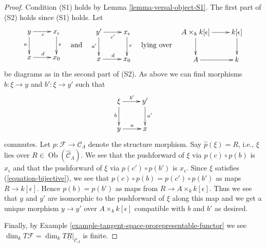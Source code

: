 \documentclass[10pt,a4paper]{amsart}
\theoremstyle{plain}
\theoremstyle{definition}
\theoremstyle{remark}
\numberwithin{equation}{subsection}
\def\Ob{\mathop{\mathrm{Ob}}\nolimits}
\begin{document}
\begin{proof}
Condition (S1) holds by
Lemma \ref{lemma-versal-object-S1}.
The first part of (S2) holds since (S1) holds. Let
$$
\vcenter{
\xymatrix{
y \ar[r]_c \ar[d]_a & x_\epsilon \ar[d]^e \\
x \ar[r]^d          & x_0
}
}
\quad\text{and}\quad
\vcenter{
\xymatrix{
y' \ar[r]_{c'} \ar[d]_{a'} & x_\epsilon \ar[d]^e \\
x \ar[r]^d                 & x_0
}
}
\quad\text{lying over}\quad
\vcenter{
\xymatrix{
A \times_k k[\epsilon] \ar[r] \ar[d] & k[\epsilon] \ar[d] \\
A  \ar[r] & k
}
}
$$
be diagrams as in the second part of (S2). As above we can find
morphisms $b : \xi \to y$ and $b' : \xi \to y'$ such that
$$
\xymatrix{
\xi \ar[r]^{b'} \ar[d]_b          & y' \ar[d]^{a'} \\
y \ar[r]^{a} & x
}
$$
commutes. Let $p : \mathcal{F} \to \mathcal{C}_\Lambda$ denote the
structure morphism. Say $\widehat{p}(\xi) = R$, i.e., $\xi$ lies over
$R \in \Ob(\widehat{\mathcal{C}}_\Lambda)$. We see that the
pushforward of $\xi$ via $p(c) \circ p(b)$ is $x_\epsilon$
and that the pushforward of $\xi$ via $p(c') \circ p(b')$ is $x_\epsilon$.
Since $\xi$ satisfies (\ref{equation-bijective}), we see that
$p(c) \circ p(b) = p(c') \circ p(b')$
as maps $R \to k[\epsilon]$. Hence $p(b) = p(b')$ as maps from
$R \to A \times_k k[\epsilon]$. Thus we see that $y$ and $y'$ are
isomorphic to the pushforward of $\xi$ along this map and we get
a unique morphism $y \to y'$ over $A \times_k k[\epsilon]$
compatible with $b$ and $b'$ as desired.

\medskip\noindent
Finally, by
Example \ref{example-tangent-space-prorepresentable-functor}
we see
$\dim_k T\mathcal{F} = \dim_k T\underline{R}|_{\mathcal{C}_\Lambda}$
is finite.
\end{proof}
\end{document}
